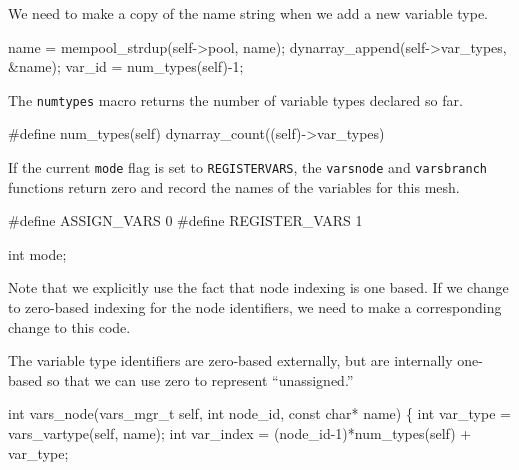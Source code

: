 \nwendcode{}\nwdocspar

We need to make a copy of the name string when we add
a new variable type.

\nwenddocs{}\endmoddef
name = mempool_strdup(self->pool, name);
dynarray_append(self->var_types, &name);
var_id = num_types(self)-1;
\nwendcode{}\nwdocspar

The {\tt{}num{}types} macro returns the number of variable types
declared so far.

\nwenddocs{}\endmoddef
#define num_types(self) dynarray_count((self)->var_types)

\nwendcode{}\nwdocspar

If the current {\tt{}mode} flag is set to {\tt{}REGISTER{}VARS},
the {\tt{}vars{}node} and {\tt{}vars{}branch} functions return zero
and record the names of the variables for this mesh.

\nwenddocs{}\endmoddef
#define ASSIGN_VARS 0
#define REGISTER_VARS 1

\nwendcode{}\nwdocspar

\nwenddocs{}\plusendmoddef
int mode;
\nwendcode{}\nwdocspar

Note that we explicitly use the fact that node indexing is one
based.  If we change to zero-based indexing for the node identifiers,
we need to make a corresponding change to this code.

The variable type identifiers are zero-based externally, but are
internally one-based so that we can use zero to represent
``unassigned.''

\nwenddocs{}\plusendmoddef
int vars_node(vars_mgr_t self, int node_id, const char* name)
\{
    int var_type  = vars_vartype(self, name);
    int var_index = (node_id-1)*num_types(self) + var_type;

